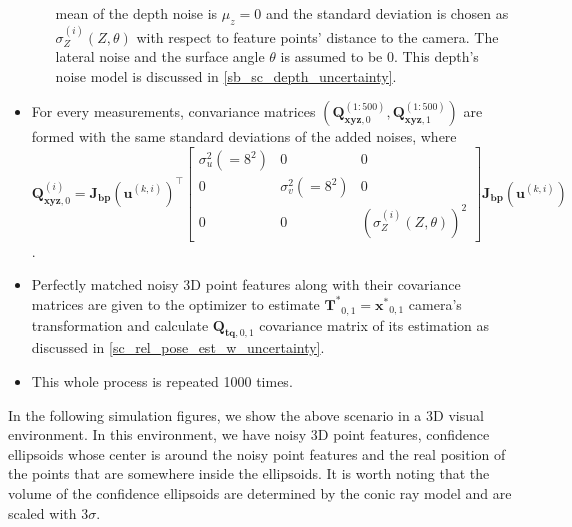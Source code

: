 \documentclass[12pt]{report}
\numberwithin{figure}{section}
\begin{document}
\begin{itemize}
\begin{itemize}
            mean of the depth noise is $\mu_z=0$ and the standard deviation is 
            chosen 
            as $\sigma_Z^{(i)} (Z,\theta)$ 
            with respect to feature points' distance to the camera.
            The lateral noise and the surface angle $\theta$ is assumed to be 0.
            This depth's noise model is discussed in \ref{sb_sc_depth_uncertainty}.
        \end{itemize}
    \item For every measurements, convariance matrices 
      $(\mathbf{Q}_{\mathbf{xyz},0}^{(1:500)}, \mathbf{Q}_{\mathbf{xyz},1}^{(1:500)})$ are formed with 
      the same standard deviations of the added noises, where  \\
    $\mathbf{Q}_{\mathbf{xyz},0}^{(i)} = 
    \mathbf{J_{bp}}(\mathbf{u}^{(k,i)})^\top
  \begin{bmatrix} 
    \sigma_u^2(=8^2) & 0 & 0 \\ 
    0 & \sigma_v^2(=8^2) & 0 \\
    0 & 0 & (\sigma_Z^{(i)}(Z, \theta))^2
  \end{bmatrix} \mathbf{J_{bp}}(\mathbf{u}^{(k,i)})$.

    \item Perfectly matched noisy 3D point features along with their covariance matrices 
      are given to the optimizer 
      to estimate $\mathbf{T^*}_{0,1}=\mathbf{x^*}_{0,1}$ camera's transformation 
      and calculate $\mathbf{Q}_{\mathbf{tq},0,1}$ covariance matrix of its estimation 
      as discussed in \ref{sc_rel_pose_est_w_uncertainty}.
    \item This whole process is repeated 1000 times.
\end{itemize}

In the following simulation figures, we show 
the above scenario in a 3D visual environment. 
In this environment, we have  
noisy 3D point features, confidence ellipsoids whose center is around the 
noisy point features and the real position of the points that are somewhere 
inside the ellipsoids.
It is worth noting that the volume of the confidence ellipsoids are 
determined by the conic ray model and are scaled with $3\sigma$.
\end{document}
